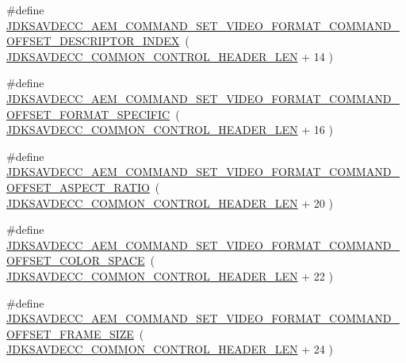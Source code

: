 \begin{DoxyCompactItemize}
\item 
\#define \hyperlink{group__command__set__video__format_ga0363694e13595afaa33bae6d345c3902}{J\+D\+K\+S\+A\+V\+D\+E\+C\+C\+\_\+\+A\+E\+M\+\_\+\+C\+O\+M\+M\+A\+N\+D\+\_\+\+S\+E\+T\+\_\+\+V\+I\+D\+E\+O\+\_\+\+F\+O\+R\+M\+A\+T\+\_\+\+C\+O\+M\+M\+A\+N\+D\+\_\+\+O\+F\+F\+S\+E\+T\+\_\+\+D\+E\+S\+C\+R\+I\+P\+T\+O\+R\+\_\+\+I\+N\+D\+EX}~( \hyperlink{group__jdksavdecc__avtp__common__control__header_gaae84052886fb1bb42f3bc5f85b741dff}{J\+D\+K\+S\+A\+V\+D\+E\+C\+C\+\_\+\+C\+O\+M\+M\+O\+N\+\_\+\+C\+O\+N\+T\+R\+O\+L\+\_\+\+H\+E\+A\+D\+E\+R\+\_\+\+L\+EN} + 14 )
\item 
\#define \hyperlink{group__command__set__video__format_ga53abbe528c20e771c659bf671661ec8a}{J\+D\+K\+S\+A\+V\+D\+E\+C\+C\+\_\+\+A\+E\+M\+\_\+\+C\+O\+M\+M\+A\+N\+D\+\_\+\+S\+E\+T\+\_\+\+V\+I\+D\+E\+O\+\_\+\+F\+O\+R\+M\+A\+T\+\_\+\+C\+O\+M\+M\+A\+N\+D\+\_\+\+O\+F\+F\+S\+E\+T\+\_\+\+F\+O\+R\+M\+A\+T\+\_\+\+S\+P\+E\+C\+I\+F\+IC}~( \hyperlink{group__jdksavdecc__avtp__common__control__header_gaae84052886fb1bb42f3bc5f85b741dff}{J\+D\+K\+S\+A\+V\+D\+E\+C\+C\+\_\+\+C\+O\+M\+M\+O\+N\+\_\+\+C\+O\+N\+T\+R\+O\+L\+\_\+\+H\+E\+A\+D\+E\+R\+\_\+\+L\+EN} + 16 )
\item 
\#define \hyperlink{group__command__set__video__format_gafa657d02dc13f6d54133c6bfe30b52fe}{J\+D\+K\+S\+A\+V\+D\+E\+C\+C\+\_\+\+A\+E\+M\+\_\+\+C\+O\+M\+M\+A\+N\+D\+\_\+\+S\+E\+T\+\_\+\+V\+I\+D\+E\+O\+\_\+\+F\+O\+R\+M\+A\+T\+\_\+\+C\+O\+M\+M\+A\+N\+D\+\_\+\+O\+F\+F\+S\+E\+T\+\_\+\+A\+S\+P\+E\+C\+T\+\_\+\+R\+A\+T\+IO}~( \hyperlink{group__jdksavdecc__avtp__common__control__header_gaae84052886fb1bb42f3bc5f85b741dff}{J\+D\+K\+S\+A\+V\+D\+E\+C\+C\+\_\+\+C\+O\+M\+M\+O\+N\+\_\+\+C\+O\+N\+T\+R\+O\+L\+\_\+\+H\+E\+A\+D\+E\+R\+\_\+\+L\+EN} + 20 )
\item 
\#define \hyperlink{group__command__set__video__format_ga0a0155ed7a4b18e4825cc4c078901cf2}{J\+D\+K\+S\+A\+V\+D\+E\+C\+C\+\_\+\+A\+E\+M\+\_\+\+C\+O\+M\+M\+A\+N\+D\+\_\+\+S\+E\+T\+\_\+\+V\+I\+D\+E\+O\+\_\+\+F\+O\+R\+M\+A\+T\+\_\+\+C\+O\+M\+M\+A\+N\+D\+\_\+\+O\+F\+F\+S\+E\+T\+\_\+\+C\+O\+L\+O\+R\+\_\+\+S\+P\+A\+CE}~( \hyperlink{group__jdksavdecc__avtp__common__control__header_gaae84052886fb1bb42f3bc5f85b741dff}{J\+D\+K\+S\+A\+V\+D\+E\+C\+C\+\_\+\+C\+O\+M\+M\+O\+N\+\_\+\+C\+O\+N\+T\+R\+O\+L\+\_\+\+H\+E\+A\+D\+E\+R\+\_\+\+L\+EN} + 22 )
\item 
\#define \hyperlink{group__command__set__video__format_ga278e1377acfd74e6ff8f43624289b174}{J\+D\+K\+S\+A\+V\+D\+E\+C\+C\+\_\+\+A\+E\+M\+\_\+\+C\+O\+M\+M\+A\+N\+D\+\_\+\+S\+E\+T\+\_\+\+V\+I\+D\+E\+O\+\_\+\+F\+O\+R\+M\+A\+T\+\_\+\+C\+O\+M\+M\+A\+N\+D\+\_\+\+O\+F\+F\+S\+E\+T\+\_\+\+F\+R\+A\+M\+E\+\_\+\+S\+I\+ZE}~( \hyperlink{group__jdksavdecc__avtp__common__control__header_gaae84052886fb1bb42f3bc5f85b741dff}{J\+D\+K\+S\+A\+V\+D\+E\+C\+C\+\_\+\+C\+O\+M\+M\+O\+N\+\_\+\+C\+O\+N\+T\+R\+O\+L\+\_\+\+H\+E\+A\+D\+E\+R\+\_\+\+L\+EN} + 24 )

\end{DoxyCompactItemize}
